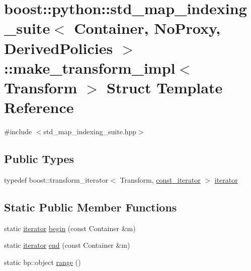 \hypertarget{structboost_1_1python_1_1std__map__indexing__suite_1_1make__transform__impl}{}\section{boost\+:\+:python\+:\+:std\+\_\+map\+\_\+indexing\+\_\+suite$<$ Container, No\+Proxy, Derived\+Policies $>$\+:\+:make\+\_\+transform\+\_\+impl$<$ Transform $>$ Struct Template Reference}
\label{structboost_1_1python_1_1std__map__indexing__suite_1_1make__transform__impl}


{\ttfamily \#include $<$std\+\_\+map\+\_\+indexing\+\_\+suite.\+hpp$>$}

\subsection*{Public Types}
\begin{DoxyCompactItemize}
\item 
typedef boost\+::transform\+\_\+iterator$<$ Transform, \hyperlink{classboost_1_1python_1_1std__map__indexing__suite_aae0c4473455223a4e048cc207ca7b3ea}{const\+\_\+iterator} $>$ \hyperlink{structboost_1_1python_1_1std__map__indexing__suite_1_1make__transform__impl_a64d7b60f0e792533c1cc89b84f341b0d}{iterator}
\end{DoxyCompactItemize}
\subsection*{Static Public Member Functions}
\begin{DoxyCompactItemize}
\item 
static \hyperlink{structboost_1_1python_1_1std__map__indexing__suite_1_1make__transform__impl_a64d7b60f0e792533c1cc89b84f341b0d}{iterator} \hyperlink{structboost_1_1python_1_1std__map__indexing__suite_1_1make__transform__impl_ab74967f0d94cdc5adcae986110974656}{begin} (const Container \&m)
\item 
static \hyperlink{structboost_1_1python_1_1std__map__indexing__suite_1_1make__transform__impl_a64d7b60f0e792533c1cc89b84f341b0d}{iterator} \hyperlink{structboost_1_1python_1_1std__map__indexing__suite_1_1make__transform__impl_ac8c3535052a0a3320e73ab5b49eb6b82}{end} (const Container \&m)
\item 
static bp\+::object \hyperlink{structboost_1_1python_1_1std__map__indexing__suite_1_1make__transform__impl_a9dbcd293bf92f94f2eaeaed8edb64ee2}{range} ()
\end{DoxyCompactItemize}


